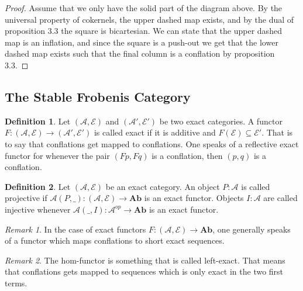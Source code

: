\documentclass[11pt]{article}
\theoremstyle{definition}
\newtheorem{definition}{Definition}[section]
\theoremstyle{remark}
\newtheorem*{remark}{Remark}
\begin{document}
            \begin{proof}
                Assume that we only have the solid part of the diagram above. By the universal property of cokernels, the upper dashed map exists, and by the dual of proposition 3.3 the square is bicartesian. We can state that the upper dashed map is an inflation, and since the square is a push-out we get that the lower dashed map exists such that the final column is a conflation by proposition 3.3.
            \end{proof}

        \subsection{The Stable Frobenis Category}

            \begin{definition}
                Let $(\mathcal{A},\mathcal{E})$ and $(\mathcal{A}',\mathcal{E}')$ be two exact categories. A functor $F:(\mathcal{A},\mathcal{E})\rightarrow (\mathcal{A}',\mathcal{E}')$ is called exact if it is additive and $F(\mathcal{E})\subseteq \mathcal{E}'$. That is to say that conflations get mapped to conflations. One speaks of a reflective exact functor for whenever the pair $(Fp,Fq)$ is a conflation, then $(p,q)$ is a conflation.
            \end{definition}

            \begin{definition}
                Let $(\mathcal{A},\mathcal{E})$ be an exact category. An object $P:\mathcal{A}$ is called projective if $\mathcal{A}(P,\_):(\mathcal{A},\mathcal{E})\rightarrow \textbf{Ab}$ is an exact functor. Objects $I:\mathcal{A}$ are called injective whenever $\mathcal{A}(\_,I):\mathcal{A}^{op}\rightarrow\textbf{Ab}$ is an exact functor.
            \end{definition}

            \begin{remark}
                In the case of exact functors $F:(\mathcal{A},\mathcal{E})\rightarrow\textbf{Ab}$, one generally speaks of a functor which maps conflations to short exact sequences.
            \end{remark}

            \begin{remark}
                The hom-functor is something that is called left-exact. That means that conflations gets mapped to sequences which is only exact in the two first terms.
            \end{remark}
\end{document}
